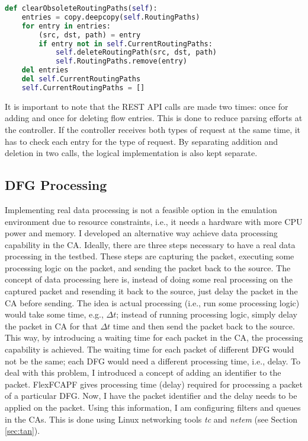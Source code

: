 \begin{lstlisting}[caption={Clear obsolete routing entries implementation},label={lst:corei},language=Python,tabsize=2,basicstyle=\footnotesize,breaklines=true, showspaces=false,showstringspaces=false,showtabs=false,frame=single]
def clearObsoleteRoutingPaths(self):
	entries = copy.deepcopy(self.RoutingPaths)
	for entry in entries:
		(src, dst, path) = entry
		if entry not in self.CurrentRoutingPaths:
			self.deleteRoutingPath(src, dst, path)
			self.RoutingPaths.remove(entry)
	del entries
	del self.CurrentRoutingPaths
	self.CurrentRoutingPaths = []
\end{lstlisting}
It is important to note that the REST API calls are made two times: once for adding and once for deleting flow entries. This is done to reduce parsing efforts at the controller. If the controller receives both types of request at the same time, it has to check each entry for the type of request. By separating addition and deletion in two calls, the logical implementation is also kept separate.

\subsection{DFG Processing}\label{sec:tmfg}
Implementing real data processing is not a feasible option in the emulation environment due to resource constraints, i.e., it needs a hardware with more CPU power and memory. I developed an alternative way achieve data processing capability in the CA. Ideally, there are three steps necessary to have a real data processing in the testbed. These steps are capturing the packet, executing some processing logic on the packet, and sending the packet back to the source. The concept of data processing here is, instead of doing some real processing on the captured packet and resending it back to the source, just delay the packet in the CA before sending. The idea is actual processing (i.e., run some processing logic) would take some time, e.g., $\Delta t$; instead of running processing logic, simply delay the packet in CA for that $\Delta t$ time and then send the packet back to the source. This way, by introducing a waiting time for each packet in the CA, the processing capability is achieved. The waiting time for each packet of different DFG would not be the same; each DFG would need a different processing time, i.e., delay. To deal with this problem, I introduced a concept of adding an identifier to the packet. FlexFCAPF gives processing time (delay) required for processing a packet of a particular DFG. Now, I have the packet identifier and the delay needs to be applied on the packet. Using this information, I am configuring filters and queues in the CAs. This is done using Linux networking tools \textit{tc} and \textit{netem} (see Section \ref{sec:tan}).


